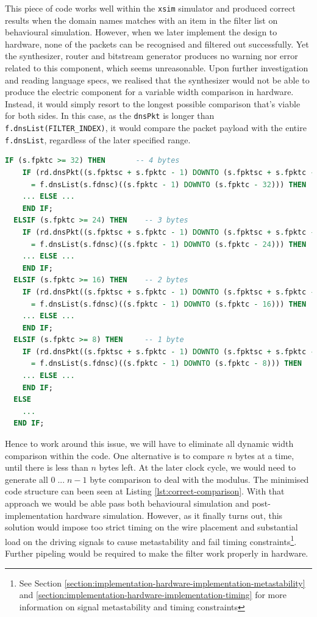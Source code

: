 \documentclass[a4paper]{report}
\newcommand{\proglang}{\textsf}
\newcommand{\code}{\texttt}
\begin{document}
This piece of code works well within the \code{xsim} simulator and produced correct results when the domain names matches with an item in the filter list on behavioural simulation. However, when we later implement the design to hardware, none of the packets can be recognised and filtered out successfully. Yet the synthesizer, router and bitstream generator produces no warning nor error related to this component, which seems unreasonable. Upon further investigation and reading language specs, we realised that the synthesizer would not be able to produce the electric component for a variable width comparison in hardware. Instead, it would simply resort to the longest possible comparison that's viable for both sides. In this case, as the \code{dnsPkt} is longer than \code{f.dnsList(FILTER\_INDEX)}, it would compare the packet payload with the entire \code{f.dnsList}, regardless of the later specified range.

\begin{lstlisting}[language=VHDL, caption=Dynamic width \code{STD\_LOGIC\_VECTOR} comparison in \proglang{VHDL}, label={lst:correct-comparison}]
  IF (s.fpktc >= 32) THEN       -- 4 bytes
    IF (rd.dnsPkt((s.fpktsc + s.fpktc - 1) DOWNTO (s.fpktsc + s.fpktc - 32))
      = f.dnsList(s.fdnsc)((s.fpktc - 1) DOWNTO (s.fpktc - 32))) THEN
    ... ELSE ...
    END IF;
  ELSIF (s.fpktc >= 24) THEN    -- 3 bytes
    IF (rd.dnsPkt((s.fpktsc + s.fpktc - 1) DOWNTO (s.fpktsc + s.fpktc - 24))
      = f.dnsList(s.fdnsc)((s.fpktc - 1) DOWNTO (s.fpktc - 24))) THEN
    ... ELSE ...
    END IF;          
  ELSIF (s.fpktc >= 16) THEN    -- 2 bytes    
    IF (rd.dnsPkt((s.fpktsc + s.fpktc - 1) DOWNTO (s.fpktsc + s.fpktc - 16))
      = f.dnsList(s.fdnsc)((s.fpktc - 1) DOWNTO (s.fpktc - 16))) THEN
    ... ELSE ...
    END IF;                 
  ELSIF (s.fpktc >= 8) THEN     -- 1 byte
    IF (rd.dnsPkt((s.fpktsc + s.fpktc - 1) DOWNTO (s.fpktsc + s.fpktc - 8))
      = f.dnsList(s.fdnsc)((s.fpktc - 1) DOWNTO (s.fpktc - 8))) THEN
    ... ELSE ...
    END IF;
  ELSE
    ...
  END IF; 
\end{lstlisting}

Hence to work around this issue, we will have to eliminate all dynamic width comparison within the code. One alternative is to compare $n$ bytes at a time, until there is less than $n$ bytes left. At the later clock cycle, we would need to generate all $0 \;...\;n-1$ byte comparison to deal with the modulus. The minimised code structure can been seen at Listing \ref{lst:correct-comparison}. With that approach we would be able pass both behavioural simulation and post-implementation hardware simulation. However, as it finally turns out, this solution would impose too strict timing on the wire placement and substantial load on the driving signals to cause metastability and fail timing constraints\footnote{See Section \ref{section:implementation-hardware-implementation-metastability} and \ref{section:implementation-hardware-implementation-timing} for more information on signal metastability and timing constraints}. Further pipeling would be required to make the filter work properly in hardware.
\end{document}
